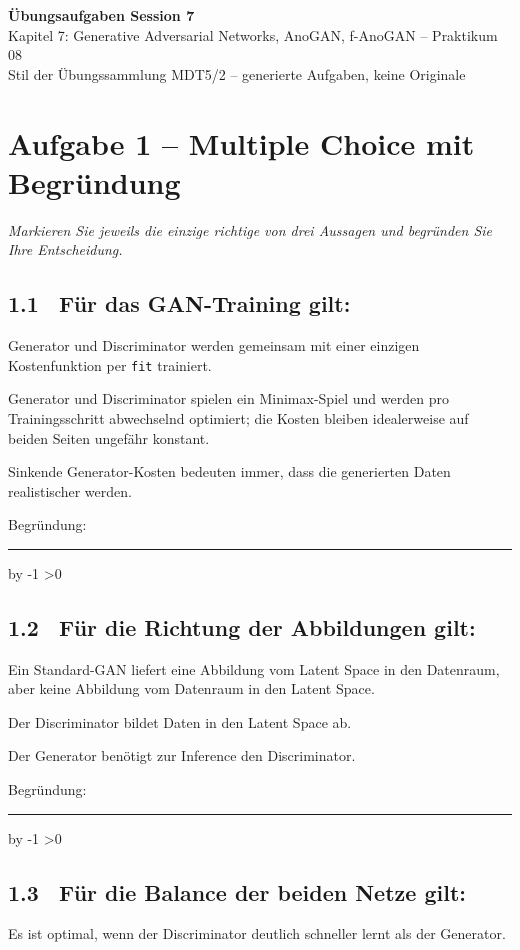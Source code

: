 \documentclass[10pt,a4paper]{article}
\newcommand{\mcbox}{\raisebox{-1pt}{\fbox{\rule{0pt}{7pt}\rule{7pt}{0pt}}}\hspace{6pt}}
\newcommand{\antwortlinien}[1]{%
  \par\vspace{2pt}%
  \newcount\zeilen \zeilen=#1
  \loop
    \noindent\rule{\linewidth}{0.4pt}\par\vspace{11pt}%
    \advance\zeilen by -1
  \ifnum\zeilen>0 \repeat
}
\begin{document}
\begin{center}
  {\Large\bfseries Übungsaufgaben Session 7}\\[4pt]
  {\large Kapitel 7: Generative Adversarial Networks, AnoGAN, f-AnoGAN -- Praktikum 08}\\[4pt]
  \small Stil der Übungssammlung MDT5/2 -- generierte Aufgaben, keine Originale
\end{center}

\vspace{4pt}

\section*{Aufgabe 1 -- Multiple Choice mit Begründung}
\emph{Markieren Sie jeweils die einzige richtige von drei Aussagen und begründen Sie Ihre Entscheidung.}

\subsection*{1.1 \ Für das GAN-Training gilt:}
\mcbox Generator und Discriminator werden gemeinsam mit einer einzigen Kostenfunktion
per \texttt{fit} trainiert.

\mcbox Generator und Discriminator spielen ein Minimax-Spiel und werden pro Trainingsschritt
abwechselnd optimiert; die Kosten bleiben idealerweise auf beiden Seiten ungefähr konstant.

\mcbox Sinkende Generator-Kosten bedeuten immer, dass die generierten Daten realistischer werden.

Begründung:
\antwortlinien{2}

\subsection*{1.2 \ Für die Richtung der Abbildungen gilt:}
\mcbox Ein Standard-GAN liefert eine Abbildung vom Latent Space in den Datenraum,
aber keine Abbildung vom Datenraum in den Latent Space.

\mcbox Der Discriminator bildet Daten in den Latent Space ab.

\mcbox Der Generator benötigt zur Inference den Discriminator.

Begründung:
\antwortlinien{2}

\subsection*{1.3 \ Für die Balance der beiden Netze gilt:}
\mcbox Es ist optimal, wenn der Discriminator deutlich schneller lernt als der Generator.
\end{document}
